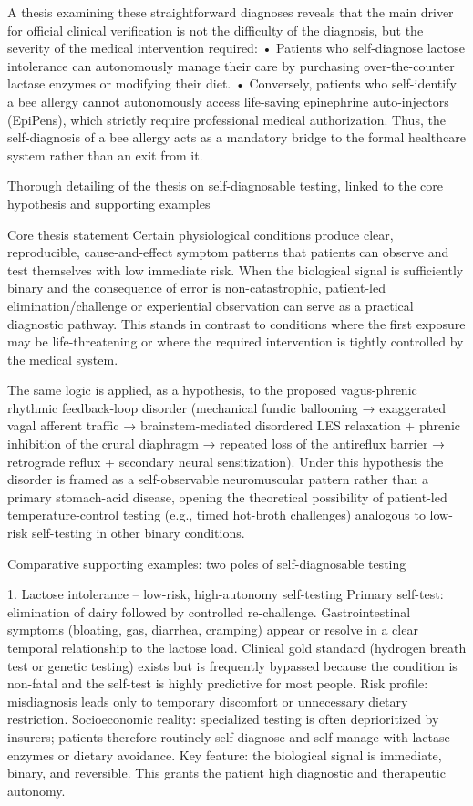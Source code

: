 A thesis examining these straightforward diagnoses reveals that the main driver for official clinical verification is not the difficulty of the diagnosis, but the severity of the medical intervention required:
• Patients who self-diagnose lactose intolerance can autonomously manage their care by purchasing over-the-counter lactase enzymes or modifying their diet.
• Conversely, patients who self-identify a bee allergy cannot autonomously access life-saving epinephrine auto-injectors (EpiPens), which strictly require professional medical authorization. Thus, the self-diagnosis of a bee allergy acts as a mandatory bridge to the formal healthcare system rather than an exit from it.

Thorough detailing of the thesis on self-diagnosable testing, linked to the core hypothesis and supporting examples

Core thesis statement
Certain physiological conditions produce clear, reproducible, cause-and-effect symptom patterns that patients can observe and test themselves with low immediate risk. When the biological signal is sufficiently binary and the consequence of error is non-catastrophic, patient-led elimination/challenge or experiential observation can serve as a practical diagnostic pathway. This stands in contrast to conditions where the first exposure may be life-threatening or where the required intervention is tightly controlled by the medical system.  

The same logic is applied, as a hypothesis, to the proposed vagus-phrenic rhythmic feedback-loop disorder (mechanical fundic ballooning → exaggerated vagal afferent traffic → brainstem-mediated disordered LES relaxation + phrenic inhibition of the crural diaphragm → repeated loss of the antireflux barrier → retrograde reflux + secondary neural sensitization). Under this hypothesis the disorder is framed as a self-observable neuromuscular pattern rather than a primary stomach-acid disease, opening the theoretical possibility of patient-led temperature-control testing (e.g., timed hot-broth challenges) analogous to low-risk self-testing in other binary conditions.

Comparative supporting examples: two poles of self-diagnosable testing

1. Lactose intolerance – low-risk, high-autonomy self-testing  
Primary self-test: elimination of dairy followed by controlled re-challenge. Gastrointestinal symptoms (bloating, gas, diarrhea, cramping) appear or resolve in a clear temporal relationship to the lactose load.  
Clinical gold standard (hydrogen breath test or genetic testing) exists but is frequently bypassed because the condition is non-fatal and the self-test is highly predictive for most people.  
Risk profile: misdiagnosis leads only to temporary discomfort or unnecessary dietary restriction.  
Socioeconomic reality: specialized testing is often deprioritized by insurers; patients therefore routinely self-diagnose and self-manage with lactase enzymes or dietary avoidance.  
Key feature: the biological signal is immediate, binary, and reversible. This grants the patient high diagnostic and therapeutic autonomy.

